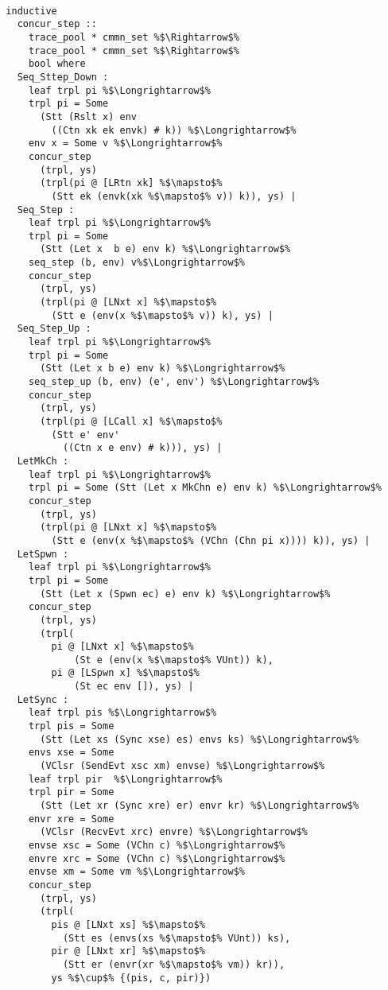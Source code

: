 \begin{lstlisting}[style=codestyle1, escapechar=\%]

  inductive
    concur_step ::
      trace_pool * cmmn_set %$\Rightarrow$%
      trace_pool * cmmn_set %$\Rightarrow$%
      bool where 
    Seq_Sttep_Down :
      leaf trpl pi %$\Longrightarrow$%
      trpl pi = Some
        (Stt (Rslt x) env
          ((Ctn xk ek envk) # k)) %$\Longrightarrow$%
      env x = Some v %$\Longrightarrow$%
      concur_step
        (trpl, ys)
        (trpl(pi @ [LRtn xk] %$\mapsto$%
          (Stt ek (envk(xk %$\mapsto$% v)) k)), ys) |
    Seq_Step :
      leaf trpl pi %$\Longrightarrow$%
      trpl pi = Some
        (Stt (Let x  b e) env k) %$\Longrightarrow$%
      seq_step (b, env) v%$\Longrightarrow$%
      concur_step
        (trpl, ys)
        (trpl(pi @ [LNxt x] %$\mapsto$%
          (Stt e (env(x %$\mapsto$% v)) k), ys) |
    Seq_Step_Up : 
      leaf trpl pi %$\Longrightarrow$%
      trpl pi = Some
        (Stt (Let x b e) env k) %$\Longrightarrow$%
      seq_step_up (b, env) (e', env') %$\Longrightarrow$%
      concur_step
        (trpl, ys)
        (trpl(pi @ [LCall x] %$\mapsto$%
          (Stt e' env'
            ((Ctn x e env) # k))), ys) |
    LetMkCh : 
      leaf trpl pi %$\Longrightarrow$%
      trpl pi = Some (Stt (Let x MkChn e) env k) %$\Longrightarrow$%
      concur_step
        (trpl, ys)
        (trpl(pi @ [LNxt x] %$\mapsto$%
          (Stt e (env(x %$\mapsto$% (VChn (Chn pi x)))) k)), ys) |
    LetSpwn :
      leaf trpl pi %$\Longrightarrow$%
      trpl pi = Some
        (Stt (Let x (Spwn ec) e) env k) %$\Longrightarrow$%
      concur_step
        (trpl, ys)
        (trpl(
          pi @ [LNxt x] %$\mapsto$%
              (St e (env(x %$\mapsto$% VUnt)) k), 
          pi @ [LSpwn x] %$\mapsto$%
              (St ec env []), ys) |
    LetSync :
      leaf trpl pis %$\Longrightarrow$%
      trpl pis = Some
        (Stt (Let xs (Sync xse) es) envs ks) %$\Longrightarrow$%
      envs xse = Some
        (VClsr (SendEvt xsc xm) envse) %$\Longrightarrow$%
      leaf trpl pir  %$\Longrightarrow$%
      trpl pir = Some
        (Stt (Let xr (Sync xre) er) envr kr) %$\Longrightarrow$%
      envr xre = Some
        (VClsr (RecvEvt xrc) envre) %$\Longrightarrow$%
      envse xsc = Some (VChn c) %$\Longrightarrow$%
      envre xrc = Some (VChn c) %$\Longrightarrow$%
      envse xm = Some vm %$\Longrightarrow$%
      concur_step
        (trpl, ys)
        (trpl(
          pis @ [LNxt xs] %$\mapsto$%
            (Stt es (envs(xs %$\mapsto$% VUnt)) ks), 
          pir @ [LNxt xr] %$\mapsto$%
            (Stt er (envr(xr %$\mapsto$% vm)) kr)), 
          ys %$\cup$% {(pis, c, pir)})

  \end{lstlisting}

